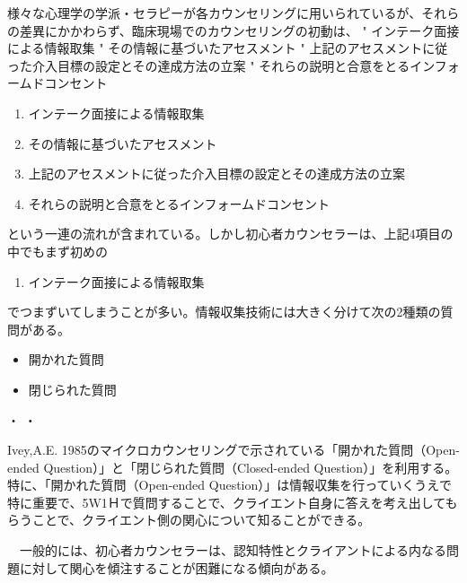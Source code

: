 \documentclass[shuuron]{kuee}
\begin{document}
様々な心理学の学派・セラピーが各カウンセリングに用いられているが、それらの差異にかかわらず、臨床現場でのカウンセリングの初動は、
"	インテーク面接による情報取集
"	その情報に基づいたアセスメント
"	上記のアセスメントに従った介入目標の設定とその達成方法の立案
"	それらの説明と合意をとるインフォームドコンセント
\begin{enumerate}
 \item インテーク面接による情報取集
 \item その情報に基づいたアセスメント
 \item 上記のアセスメントに従った介入目標の設定とその達成方法の立案
 \item それらの説明と合意をとるインフォームドコンセント
\end{enumerate}
という一連の流れが含まれている。しかし初心者カウンセラーは、上記4項目の中でもまず初めの
\begin{enumerate}
 \item インテーク面接による情報取集
\end{enumerate}
でつまずいてしまうことが多い。情報収集技術には大きく分けて次の2種類の質問がある。
\begin{itemize}
\item 開かれた質問
\item 閉じられた質問
\end{itemize}
・
・


Ivey,A.E. 1985のマイクロカウンセリングで示されている「開かれた質問（Open-ended Question）」と「閉じられた質問（Closed-ended Question）」を利用する。特に、「開かれた質問（Open-ended Question）」は情報収集を行っていくうえで特に重要で、5W1Ｈで質問することで、クライエント自身に答えを考え出してもらうことで、クライエント側の関心について知ることができる。　　　　　　　　　　　　　　　　　　　　　　　　　　　　　　　　　　　　　　　　　　　　　　　　　　　　　　　　　　　　　　　　　　　　　　　　　　　　

　一般的には、初心者カウンセラーは、認知特性とクライアントによる内なる問題に対して関心を傾注することが困難になる傾向がある。
\end{document}
